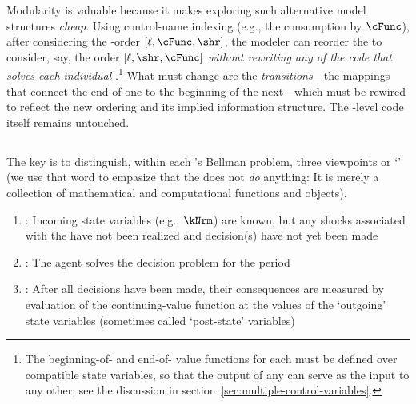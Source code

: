 \documentclass[SolvingMicroDSOPs]{subfiles}
\begin{document}

Modularity is valuable because it makes exploring such alternative model structures \textit{cheap}.  Using control-name indexing (e.g., the consumption {\stg} by $\cFunc$), after considering the {\stg}-order $[\ell,\cFunc,\shr]$, the modeler can reorder the {\stgs} to consider, say, the order $[\ell,\shr,\cFunc]$ \textit{without rewriting any of the code that solves each individual {\stg}}.\footnote{The beginning-of-{\stg} and end-of-{\stg} value functions for each {\stg} must be defined over compatible state variables, so that the output of any {\stg} can serve as the input to any other; see the discussion in section~\ref{sec:multiple-control-variables}.
}  What must change are the \textit{transitions}---the mappings that connect the end of one {\stg} to the beginning of the next---which must be rewired to reflect the new ordering and its implied information structure.  The {\stg}-level code itself remains untouched.

\hypertarget{prchs}{}
\subsection{\Prchs}\label{subsec:prchs}

The key is to distinguish, within each {\stg}'s Bellman problem, three viewpoints or `{\prchs}' (we use that word to empasize that the {\prch} does not \textit{do} anything: It is merely a collection of mathematical and computational functions and objects).
\begin{enumerate}
\item \textbf{\Arrival}: Incoming state variables (e.g., $\kNrm$) are known, but any shocks associated with the {\stg} have not been realized and decision(s) have not yet been made
\item \textbf{\Decision}: The agent solves the decision problem for the period
\item \textbf{\Continuation}: After all decisions have been made, their consequences are measured by evaluation of the continuing-value function at the values of the `outgoing' state variables (sometimes called `post-state' variables)
\end{enumerate}
\end{document}
